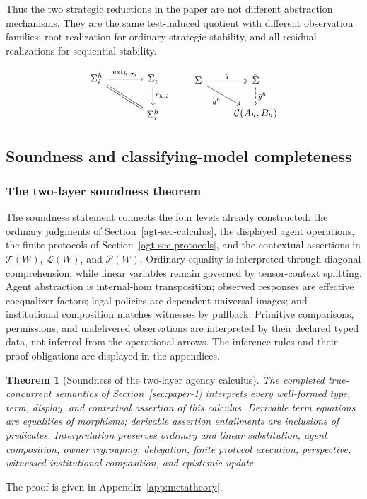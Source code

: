 \documentclass[11pt,a4paper]{article}
\numberwithin{equation}{section}
\newtheorem{theorem}{Theorem}[section]
\theoremstyle{definition}
\theoremstyle{remark}
\theoremstyle{plain}
\providecommand{\cT}{\mathcal{T}}
\providecommand{\cL}{\mathcal{L}}
\providecommand{\cP}{\mathcal{P}}
\begin{document}
Thus the two strategic reductions in the paper are not different
abstraction mechanisms. They are the same test-induced quotient with
different observation families: root realization for ordinary strategic
stability, and all residual realizations for sequential stability.

\[
\begin{tikzcd}[column sep=large]
 \Sigma_i^h\arrow[r,"\operatorname{ext}_{h,\sigma_i}"]
 \arrow[dr,equal]&\Sigma_i\arrow[d,"r_{h,i}"]\\
 &\Sigma_i^h
\end{tikzcd}
\qquad
\begin{tikzcd}
 \Sigma\arrow[r,two heads,"q"]\arrow[dr,"g^h"']&\bar\Sigma
 \arrow[d,dashed,"\bar g^h"]\\
 &\mathcal C(A_h,B_h)
\end{tikzcd}
\]

\subsection{Soundness and classifying-model completeness}
\label{agt-sec-metatheory}

\subsubsection{The two-layer soundness theorem}

The soundness statement connects the four levels already
constructed: the ordinary judgments of Section~\ref{agt-sec-calculus},
the displayed agent operations, the finite protocols of
Section~\ref{agt-sec-protocols}, and the contextual assertions in
$\cT(W)$, $\cL(W)$, and $\cP(W)$. Ordinary equality is
interpreted through diagonal comprehension, while linear variables
remain governed by tensor-context splitting. Agent abstraction is
internal-hom transposition; observed responses are effective
coequalizer factors; legal policies are dependent universal images;
and institutional composition matches witnesses by pullback.
Primitive comparisons, permissions, and undelivered observations are
interpreted by their declared typed data, not inferred from the
operational arrows. The inference rules and their proof obligations
are displayed in the appendices.

\begin{theorem}[Soundness of the two-layer agency calculus]
\label{agt-thm-soundness}
The completed true-concurrent semantics of Section~\ref{sec:paper-1} interprets
every well-formed type, term, display, and contextual assertion of this
calculus. Derivable term equations are equalities of morphisms; derivable
assertion entailments are inclusions of predicates. Interpretation preserves
ordinary and linear substitution, agent composition, owner regrouping,
delegation, finite protocol execution, perspective, witnessed institutional
composition, and epistemic update.
\end{theorem}
\par\noindent The proof is given in Appendix~\ref{app:metatheory}.
\end{document}
